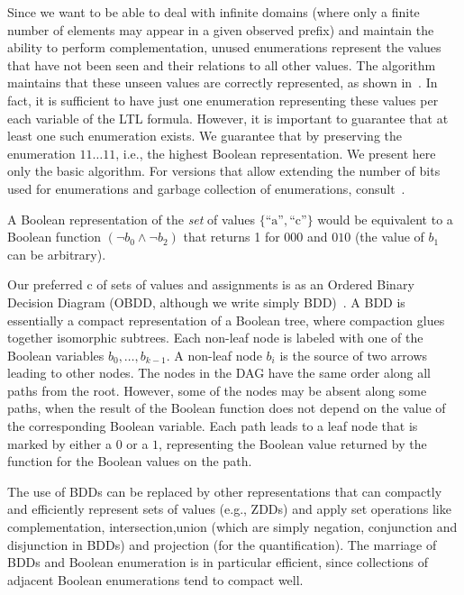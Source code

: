 %

Since we want to be able to deal with infinite domains
(where only a finite number of elements may appear in a given observed prefix) and maintain the ability to perform
complementation, unused enumerations represent the
values that have not been seen and their relations
to all other values. The algorithm maintains that these unseen values are correctly represented, as shown in~\cite{HPU}. In fact, it is sufficient to have just one enumeration representing these values per each variable of the LTL formula. However, it is important to guarantee that at least one such enumeration
exists. We guarantee that by preserving the enumeration $11\ldots11$, i.e., the highest Boolean representation.
We present here only the basic algorithm. For versions that
allow extending the number of bits used for enumerations and garbage collection of enumerations, consult~\cite{HP}.

A Boolean representation of the {\em set} of values 
$\{\text{``a''},\text{``c''}\} $ would be equivalent to a Boolean function $(\neg b_0 \wedge \neg b_2)$ that returns 1 for $000$ and $010$ (the value
of $b_1$ can be arbitrary).


    Our preferred c of sets of values and
assignments is as an Ordered Binary Decision
Diagram (OBDD, although we write simply BDD)~\cite{Bryant}.
A BDD is essentially a compact representation 
of a Boolean tree, where compaction glues together isomorphic subtrees. Each non-leaf node is labeled with one of the
Boolean variables $b_0,\ldots,b_{k-1}$. A non-leaf node $b_i$ 
is the source of two 
arrows leading to other nodes. 
The nodes in the DAG have the
same order along all paths from the root. However, some of the nodes may be
absent along some paths, when the result of the Boolean function does not 
depend on the value of the corresponding Boolean variable. Each path leads 
to a leaf node that is marked by either a $0$ or a $1$, representing the 
Boolean value returned by the function for the Boolean values on the path.

The use of BDDs can be replaced by other representations that
can compactly and efficiently represent sets of values (e.g., ZDDs) and
apply set operations like complementation, intersection,union (which are simply negation, conjunction and disjunction
in BDDs) and projection (for the quantification).
The marriage of BDDs and Boolean enumeration is in particular
efficient, since collections of adjacent Boolean enumerations tend to compact well.



